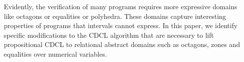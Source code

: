 Evidently, the verification of many programs requires more expressive
domains like octagons or equalities or polyhedra.  These domains capture
interesting properties of programs that intervals cannot express.  In this
paper, we identify specific modifications to the CDCL algorithm that are
necessary to lift propositional CDCL to relational abstract domains such as
octagons, zones and equalities over numerical variables.
